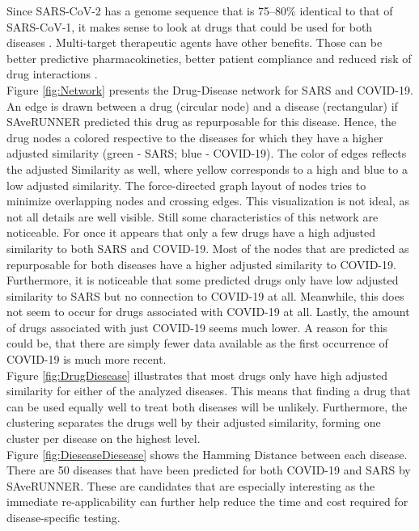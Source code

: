Since SARS-CoV-2 has a genome sequence that is 75–80\% identical to that of SARS-CoV-1, it makes sense to look at drugs that could be used for both diseases \cite{Ghasemnejad_Berenji_2020}. Multi-target therapeutic agents have other benefits. Those can be better predictive pharmacokinetics, better patient compliance and reduced risk of drug interactions \cite{Mohamed_2021}.\\
Figure \ref{fig:Network} presents the Drug-Disease network for SARS and COVID-19. An edge is drawn between a drug (circular node) and a disease (rectangular) if SAveRUNNER predicted this drug as repurposable for this disease. Hence, the drug nodes a colored respective to the diseases for which they have a higher adjusted similarity (green - SARS; blue - COVID-19). The color of edges reflects the adjusted Similarity as well, where yellow corresponds to a high and blue to a low adjusted similarity. The force-directed graph layout of nodes tries to minimize overlapping nodes and crossing edges. 
This visualization is not ideal, as not all details are well visible. Still some characteristics of this network are noticeable. For once it appears that only a few drugs have a high adjusted similarity to both SARS and COVID-19. Most of the nodes that are predicted as repurposable for both diseases have a higher adjusted similarity to COVID-19. 
Furthermore, it is noticeable that some predicted drugs only have low adjusted similarity to SARS but no connection to COVID-19 at all. Meanwhile, this does not seem to occur for drugs associated with COVID-19 at all. 
Lastly, the amount of drugs associated with just COVID-19 seems much lower. A reason for this could be, that there are simply fewer data available as the first occurrence of COVID-19 is much more recent.  \\
Figure \ref{fig:DrugDiesease} illustrates that most drugs only have high adjusted similarity for either of the analyzed diseases. This means that finding a drug that can be used equally well to treat both diseases will be unlikely. Furthermore, the clustering separates the drugs well by their adjusted similarity, forming one cluster per disease on the highest level. \\
Figure \ref{fig:DieseaseDiesease} shows the Hamming Distance between each disease. There are 50 diseases that have been predicted for both COVID-19 and SARS by SAveRUNNER. These are candidates that are especially interesting as the immediate re-applicability can further help reduce the time and cost required for disease-specific testing.

